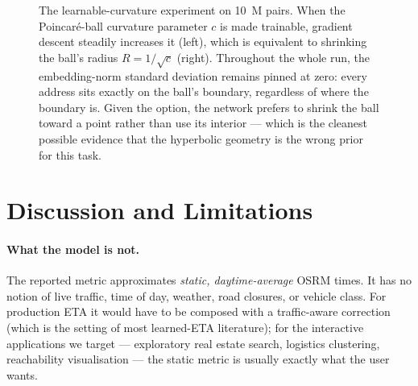\documentclass[11pt,a4paper]{article}
\begin{document}
\begin{figure}[H]
\caption{The learnable-curvature experiment on 10~M pairs. When the
Poincar\'e-ball curvature parameter $c$ is made trainable, gradient
descent steadily increases it (left), which is equivalent to
shrinking the ball's radius $R = 1/\sqrt{c}$ (right). Throughout the
whole run, the embedding-norm standard deviation remains pinned at
zero: every address sits exactly on the ball's boundary, regardless
of where the boundary is. Given the option, the network prefers to
shrink the ball toward a point rather than use its interior ---
which is the cleanest possible evidence that the hyperbolic geometry
is the wrong prior for this task.}
\label{fig:curvature}
\end{figure}

\section{Discussion and Limitations}

\paragraph{What the model is not.}
The reported metric approximates \emph{static, daytime-average} OSRM
times. It has no notion of live traffic, time of day, weather, road
closures, or vehicle class. For production ETA it would have to be
composed with a traffic-aware correction (which is the setting of
most learned-ETA literature); for the interactive applications we
target --- exploratory real estate search, logistics clustering,
reachability visualisation --- the static metric is usually exactly
what the user wants.
\end{document}

